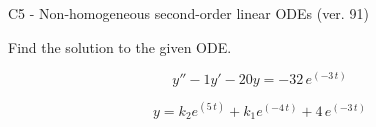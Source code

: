 \begin{exercise}
  \begin{exerciseTitle}C5 - Non-homogeneous second-order linear ODEs (ver. 91)\end{exerciseTitle}
  \begin{exerciseStatement}
    
Find the solution to the given ODE.

    
\[y''-1y'-20y = -32 \, e^{\left(-3 \, t\right)}\]

  \end{exerciseStatement}
  \begin{exerciseAnswer}
    
\[y= k_{2} e^{\left(5 \, t\right)} + k_{1} e^{\left(-4 \, t\right)} + 4 \, e^{\left(-3 \, t\right)}\]

  \end{exerciseAnswer}
\end{exercise}